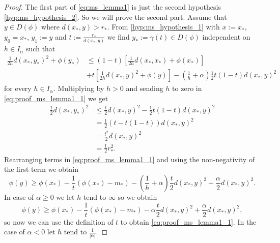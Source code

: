 \documentclass[a4paper,11pt, leqno]{scrreprt} %
\renewcommand{\leq}{\leqslant}
\renewcommand{\leq}{\leqslant}
\renewcommand{\geq}{\geqslant}
\theoremstyle{change}
\theoremstyle{nonumberplain}
\newtheorem{proof}{Proof}
\begin{document}
\begin{proof}
  The first part of \eqref{eq:ms_lemma1} is just the second hypothesis
  \ref{hyp:ms_hypothesis_2}. So we will prove the second part. Assume
  that $y \in D(\phi)$ where $d(x_*, y) > r_*$. From \ref{hyp:ms_hypothesis_1} with $x := x_*$, $y_0 = x_*$, $y_1 := y$ and $t :=
  \frac{r_*}{d(x_*, y)}$ we find $y_* := \gamma(t) \in D(\phi)$
  independent on $h \in I_\alpha$ such that
  \begin{equation}
    \label{eq:proof_ms_lemma1_1}
    \begin{split}
      \frac1{2h} d(x_*, y_*)^2 + \phi(y_*) &\leq (1 - t) \left
        [\frac1{2h} d(x_*, x_*) + \phi(x_*) \right ]\\
      &+ t \left [ \frac1{2h} d(x_*, y)^2 + \phi(y) \right ] - \left (
        \frac1h + \alpha \right ) \frac12 t(1 - t) d(x_*, y)^2
    \end{split}
  \end{equation}
  for every $h \in I_\alpha$. Multiplying by $h > 0$ and sending $h$
  to zero in \eqref{eq:proof_ms_lemma1_1} we get 
  \begin{equation}
    \label{eq:proof_ms_lemma1_2}
    \begin{split}
      \frac12 d(x_*, y_*)^2 &\leq \frac{t}2 d(x_*, y)^2 - \frac12 t(1
      - t) d(x_*, y)^2\\
      &=\frac12 (t - t(1 - t)) d(x_*, y)^2\\
      &=\frac{t^2}2 d(x_*, y)^2\\
      &=\frac12 r_*^2.
    \end{split}
  \end{equation}
  Rearranging terms in \eqref{eq:proof_ms_lemma1_1} and using the
  non-negativity of the first term we obtain
  \begin{equation}
    \label{eq:proof_ms_lemma1_3}
    \phi(y) \geq \phi(x_*) - \frac1t (\phi(x_*) - m_*) - \left
      (\frac1h + \alpha \right ) \frac{t}2 d(x_*, y)^2 + \frac\alpha2
    d(x_*, y)^2.
  \end{equation}
  In case of $\alpha \geq 0$ we let $h$ tend to $\infty$ so we obtain
  \begin{equation}
    \label{eq:proof_ms_lemma1_4}
    \phi(y) \geq \phi(x_*) - \frac1t (\phi(x_*) - m_*) -
     \alpha \frac{t}2 d(x_*, y)^2 + \frac\alpha2
    d(x_*, y)^2,
  \end{equation}
  so now we can use the definition of $t$ to obtain
  \eqref{eq:proof_ms_lemma1_1}. In the case of $\alpha < 0$ let $h$
  tend to $\frac1{|\alpha|}$.
\end{proof}
\end{document}
